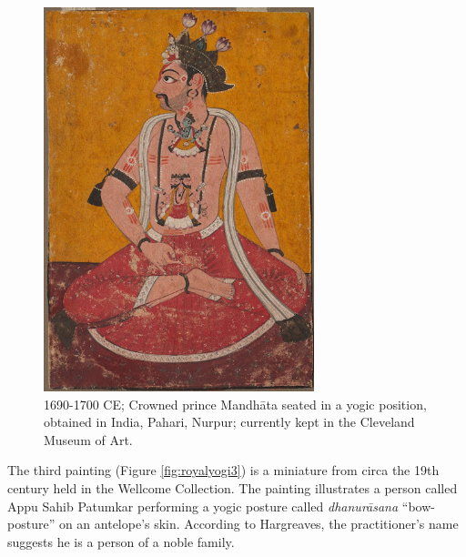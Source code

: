 \begin{figure}[ht]
	\centering
  \includegraphics[width=0.7\textwidth]{pics/royalyogi1.jpg}
	\caption{1690-1700 CE; Crowned prince Mandhāta seated in a yogic position, obtained in India, Pahari, Nurpur; currently kept in the Cleveland Museum of Art.}
	\label{fig:royalyogi1}
\end{figure}

The third painting (Figure \ref{fig:royalyogi3}) is a miniature from circa the 19th century held in the Wellcome Collection. The painting illustrates a person called Appu Sahib Patumkar performing a yogic posture called \textit{dhanurāsana} ``bow-posture'' on an antelope's skin. According to Hargreaves, the practitioner's name suggests he is a person of a noble family.

